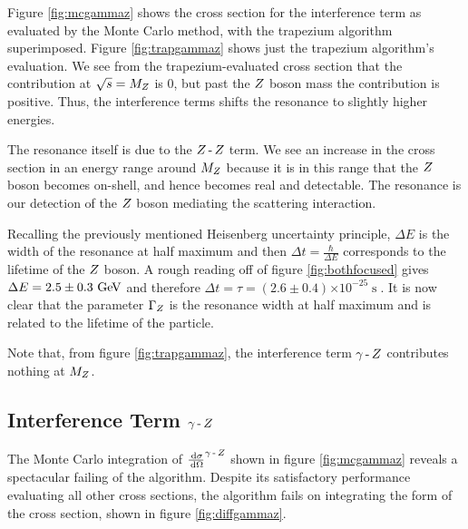 \documentclass[]{article}
\providecommand{\e}[1]{\ensuremath{\times 10^{#1}}}
\begin{document}
Figure \ref{fig:mcgammaz} shows the cross section for the interference term as evaluated by the Monte Carlo method, with the trapezium algorithm superimposed. Figure \ref{fig:trapgammaz} shows just the trapezium algorithm's evaluation. We see from the trapezium-evaluated cross section that the contribution at $\sqrt{s}=M_{Z }$ is $0$, but past the $Z $ boson mass the contribution is positive. Thus, the interference terms shifts the resonance to slightly higher energies.

The resonance itself is due to the $Z \operatorname{-}Z $ term. We see an increase in the cross section in an energy range around $M_{Z }$ because it is in this range that the $Z $ boson becomes on-shell, and hence becomes real and detectable. The resonance is our detection of the $Z $ boson mediating the scattering interaction.

Recalling the previously mentioned Heisenberg uncertainty principle, $\Delta E$ is the width of the resonance at half maximum and then $\Delta t = \frac{\hbar}{\Delta E}$ corresponds to the lifetime of the $Z $ boson. A rough reading off of figure \ref{fig:bothfocused} gives $\Delta E = 2.5\pm0.3\GeV$ and therefore $\Delta t = \tau = (2.6\pm0.4)\e{-25} \operatorname{s}$. It is now clear that the parameter $\Gamma_{Z }$ is the resonance width at half maximum and is related to the lifetime of the particle.

Note that, from figure \ref{fig:trapgammaz}, the interference term $\gamma\operatorname{-}Z $ contributes nothing at $M_{Z }$.\footnotemark


\subsection{Interference Term $\gamma\operatorname{-}Z $}\label{ssec:interference}

The Monte Carlo integration of $\frac{\,\operatorname{d}\!{\sigma}}{\,\operatorname{d}\!{\Omega}}^{\gamma\operatorname{-}Z }$ shown in figure \ref{fig:mcgammaz} reveals a spectacular failing of the algorithm. Despite its satisfactory performance evaluating all other cross sections, the algorithm fails on integrating the form of the cross section, shown in figure \ref{fig:diffgammaz}.
\end{document}
